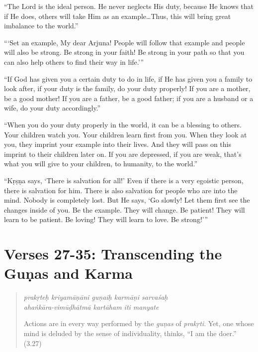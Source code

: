\documentclass[12pt, twoside, openright]{memoir}
\begin{document}
\enquote{The Lord is the ideal person. He never neglects His duty, because He knows that if He does, others will take Him as an example\ldots Thus, this will bring great imbalance to the world.}

\enquote{\enquote{Set an example, My dear Arjuna! People will follow that example and people will also be strong. Be strong in your faith! Be strong in your path so that you can also help others to find their way in life.}}

\enquote{If God has given you a certain duty to do in life, if He has given you a family to look after, if your duty is the family, do your duty properly! If you are a mother, be a good mother! If you are a father, be a good father; if you are a husband or a wife, do your duty accordingly.}

\enquote{When you do your duty properly in the world, it can be a blessing to others. Your children watch you. Your children learn first from you. When they look at you, they imprint your example into their lives. And they will pass on this imprint to their children later on. If you are depressed, if you are weak, that’s what you will give to your children, to humanity, to the world.}

\enquote{Kṛṣṇa says, \enquote{There is salvation for all!} Even if there is a very egoistic person, there is salvation for him. There is also salvation for people who are into the mind. Nobody is completely lost. But He says, \enquote{Go slowly! Let them first see the changes inside of you. Be the example. They will change. Be patient! They will learn to be patient. Be loving! They will learn to love. Be strong!}}

\newpage
\section{Verses 27-35: Transcending the Guṇas and Karma}\label{sec-verses-27-35-transcending-the-gunas-and-karma}

\par
\begin{verse}
\textit{prakṛteḥ kriyamāṇāni guṇaiḥ karmāṇi sarvaśaḥ} \\
\textit{ahaṅkāra-vimūḍhātmā kartāham iti manyate}

\noindent Actions are in every way performed by the \textit{guṇas} of \textit{prakṛti}. Yet, one whose mind is deluded by the sense of individuality, thinks, \enquote{I am the doer.} (3.27)
\end{verse}
\par
\end{document}
